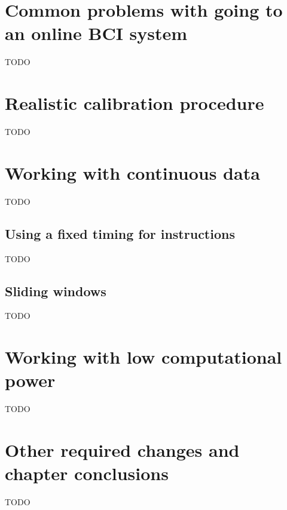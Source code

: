 \section{Common problems with going to an online BCI system}
\label{sec:online_bci_system_common_problems}

TODO

\section{Realistic calibration procedure}
\label{sec:online_bci_system_common_calibration}

TODO

\section{Working with continuous data}
\label{sec:online_bci_system_continous_data}

TODO


\subsection{Using a fixed timing for instructions}
\label{subsec:online_bci_system_continous_data_fixed_timing}

TODO


\subsection{Sliding windows}
\label{subsec:online_bci_system_continous_data_sliding_window}

TODO

\section{Working with low computational power}
\label{sec:online_bci_system_low_computational_power}

TODO

\section{Other required changes and chapter conclusions}
\label{sec:online_bci_system_other_changes_conclusion}

TODO
